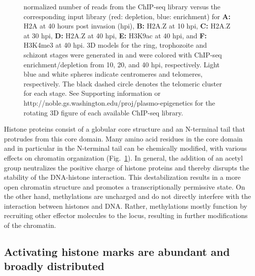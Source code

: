 \begin{figure}
{normalized number of reads from the ChIP-seq library versus the corresponding
input library (red: depletion, blue: enrichment) for \textbf{A:} H2A at
40 hours post invasion (hpi), \textbf{B:} H2A.Z at 10 hpi, \textbf{C:} H2A.Z
at 30 hpi, \textbf{D:} H2A.Z
at 40 hpi, \textbf{E:} H3K9ac at 40 hpi, and \textbf{F:} H3K4me3 at 40 hpi. 3D
models for the ring, trophozoite and schizont stages were generated in
\citet{ay:three-dimensional} and were colored with ChIP-seq enrichment/depletion
from 10, 20, and 40 hpi, respectively. Light blue and white spheres indicate
centromeres and telomeres, respectively. The black dashed circle
denotes the telomeric cluster for each stage. See Supporting information or
http://noble.gs.washington.edu/proj/plasmo-epigenetics for the
rotating 3D figure of each available ChIP-seq library.}
\label{fig:structure}
\end{figure}

Histone proteins consist of a globular core structure and an N-terminal tail
that protrudes from this core domain. Many amino acid residues in the core
domain and in particular in the N-terminal tail can be chemically modified,
with various effects on chromatin organization (Fig.~\ref{fig:structure}). In general, the
addition of an acetyl group neutralizes the positive charge of histone
proteins and thereby disrupts the stability of the DNA-histone interaction.
This destabilization results in a more open chromatin structure and promotes a
transcriptionally permissive state. On the other hand, methylations are
uncharged and do not directly interfere with the interaction between histones
and DNA. Rather, methylations mostly function by recruiting other effector
molecules to the locus, resulting in further modifications of the chromatin.

\subsection{Activating histone marks are abundant and broadly distributed}

